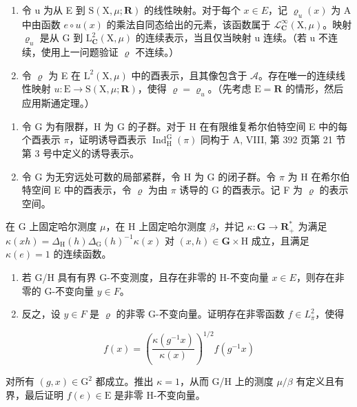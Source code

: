 \begin{enumerate}
\def\labelenumi{\alph{enumi})}
\setcounter{enumi}{1}
\item
  令 u 为从 E 到 \(\mathrm{S}(\mathrm{X},\mu;\mathbf{R})\) 的线性映射。对于每个 \(x\in E\)，记 \(\varrho_{u}(x)\) 为 A 中由函数 \(e\circ u(x)\) 的乘法自同态给出的元素，该函数属于 \(\mathcal{L}_{\mathbf{C}}^{\infty}(\mathrm{X},\mu)\)。映射 \(\varrho_{u}\) 是从 G 到 \(\mathrm{L}_{\mathbf{C}}^{2}(\mathrm{X},\mu)\) 的连续表示，当且仅当映射 u 连续。（若 u 不连续，使用上一问题验证 \(\varrho\) 不连续。）
\item
  令 \(\varrho\) 为 E 在 \(\mathrm{L}^2 (\mathrm{X},\mu)\) 中的酉表示，且其像包含于 \(\mathcal{A}\)。存在唯一的连续线性映射 \(u\colon \mathrm{E}\to \mathrm{S}(\mathrm{X},\mu ;\mathbf{R})\)，使得 \(\varrho = \varrho_{u}\)。（先考虑 \(\mathrm{E} = \mathbf{R}\) 的情形，然后应用斯通定理。）
\end{enumerate}

\begin{enumerate}
\def\labelenumi{\arabic{enumi})}
\setcounter{enumi}{18}
\item
  令 G 为有限群，H 为 G 的子群。对于 H 在有限维复希尔伯特空间 E 中的每个酉表示 \(\pi\)，证明诱导酉表示 \(\operatorname{Ind}_{\mathrm{H}}^{\mathrm{G}}(\pi)\) 同构于 A, VIII, 第 392 页第 21 节第 3 号中定义的诱导表示。
\item
  令 G 为无穷远处可数的局部紧群，令 H 为 G 的闭子群。令 \(\pi\) 为 H 在希尔伯特空间 E 中的酉表示，令 \(\varrho\) 为由 \(\pi\) 诱导的 G 的酉表示。记 F 为 \(\varrho\) 的表示空间。
\end{enumerate}

在 G 上固定哈尔测度 \(\mu\)，在 H 上固定哈尔测度 \(\beta\)，并记 \(\kappa\colon\mathbf{G}\to\mathbf{R}_{+}^{*}\) 为满足 \(\kappa(xh)=\Delta_{\mathrm{H}}(h)\Delta_{\mathrm{G}}(h)^{-1}\kappa(x)\) 对 \((x,h)\in\mathbf{G}\times\mathrm{H}\) 成立，且满足 \(\kappa(e)=1\) 的连续函数。

\begin{enumerate}
\def\labelenumi{\alph{enumi})}
\item
  若 G/H 具有有界 G-不变测度，且存在非零的 H-不变向量 \(x \in E\)，则存在非零的 G-不变向量 \(y \in F\)。
\item
  反之，设 \(y \in F\) 是 \(\varrho\) 的非零 G-不变向量。证明存在非零函数 \(f \in L_{\overline{\pi}}^{2}\)，使得
\end{enumerate}

\[
f (x) = \left(\frac {\kappa (g ^ {- 1} x)}{\kappa (x)}\right) ^ {1 / 2} f (g ^ {- 1} x)
\]

对所有 \((g, x) \in \mathrm{G}^{2}\) 都成立。推出 \(\kappa = 1\)，从而 G/H 上的测度 \(\mu/\beta\) 有定义且有界，最后证明 \(f(e) \in \mathrm{E}\) 是非零 H-不变向量。